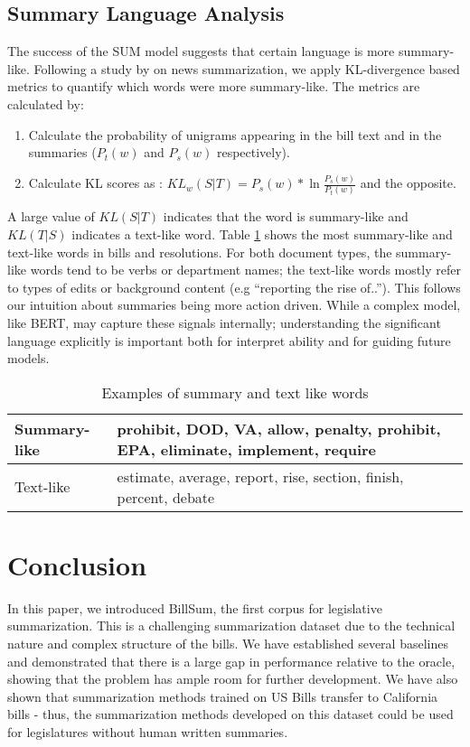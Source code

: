 \documentclass[11pt,a4paper]{article}
\begin{document}
\subsection{Summary Language Analysis}
\label{sec:methods:sum}
The success of the SUM model suggests that certain language is more summary-like. Following a study by \citet{hong2014improving} on news summarization, we apply KL-divergence based metrics to quantify which words were more summary-like. The metrics are calculated by:


\begin{enumerate}

    \item Calculate the probability of unigrams appearing in the bill text and in the summaries ($P_t(w)$ and $P_s(w)$ respectively). 
    \item Calculate KL scores as : $KL_w(S | T) = P_s(w) * \ln{\frac{P_s(w)}{P_t(w)}}$ and the opposite. 
\end{enumerate}

A large value of $KL(S|T)$ indicates that the word is summary-like and $KL(T|S)$ indicates a text-like word. Table \ref{tab:kl_examples} shows the most summary-like and text-like words in bills and resolutions. For both document types, the summary-like words tend to be verbs or department names; the text-like words mostly refer to types of edits or background content (e.g ``reporting the rise of..''). This follows our intuition about summaries being more action driven. While a complex model, like BERT, may capture these signals internally; understanding the significant language explicitly is important both for interpret ability and for guiding future models.

\begin{table}[h]
\caption{Examples of summary and text like words}
\label{tab:kl_examples}
\begin{tabular}{|l|p{1.72in}|}
\hline
Summary-like & prohibit, DOD, VA, allow, penalty, prohibit, EPA, eliminate, implement, require \\ \hline
Text-like & estimate, average, report, rise, section, finish, percent, debate
 \\ \hline

\end{tabular}
\end{table}

\section{Conclusion}
In this paper, we introduced BillSum, the first corpus for legislative summarization. This is a challenging summarization dataset due to the technical nature and complex structure of the bills. We have established several baselines and demonstrated that there is a large gap in performance relative to the oracle, showing that the problem has ample room for further development. We have also shown that summarization methods trained on US Bills transfer to California bills - thus, the summarization methods developed on this dataset could be used for legislatures without human written summaries.
\end{document}
